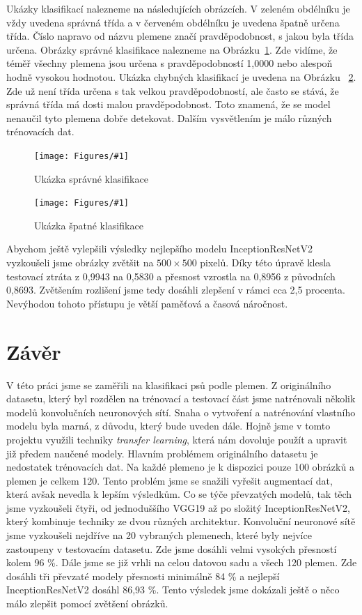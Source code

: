 \documentclass[a4paper,12pt]{article}
\newcommand{\image}[4]{\begin{figure}[ht!] \centering \texttt{[image: Figures/\#1]} \caption{#2} \label{#3} \end{figure}}
\begin{document}
Ukázky klasifikací nalezneme na následujících obrázcích. V zeleném obdélníku je vždy uvedena správná třída a v červeném obdélníku je uvedena špatně určena třída. Číslo napravo od názvu plemene značí pravděpodobnost, s jakou byla třída určena. Obrázky správné klasifikace nalezneme na Obrázku~\ref{fig:correct_class}. Zde vidíme, že téměř všechny plemena jsou určena s pravděpodobností 1,0000 nebo alespoň hodně vysokou hodnotou. Ukázka chybných klasifikací je uvedena na Obrázku ~\ref{fig:wrong_class}. Zde už není třída určena s tak velkou pravděpodobností, ale často se stává, že správná třída má dosti malou pravděpodobnost. Toto znamená, že se model nenaučil tyto plemena dobře detekovat. Dalším vysvětlením je málo různých trénovacích dat. 

\image{correct_predictions.pdf}{Ukázka správné klasifikace}{fig:correct_class}{0.8}
\image{wrong_predictions.pdf}{Ukázka špatné klasifikace}{fig:wrong_class}{0.8}

Abychom ještě vylepšili výsledky nejlepšího modelu InceptionResNetV2 vyzkoušeli jsme obrázky zvětšit na $500 \times 500$ pixelů. Díky této úpravě klesla testovací ztráta z 0,9943 na 0,5830 a přesnost vzrostla na 0,8956 z původních 0,8693. Zvětšením rozlišení jsme tedy dosáhli zlepšení v rámci cca 2,5 procenta. Nevýhodou tohoto přístupu je větší paměťová a časová náročnost.

\section{Závěr}
V této práci jsme se zaměřili na klasifikaci psů podle plemen. Z originálního datasetu, který byl rozdělen na trénovací a testovací část jsme natrénovali několik modelů konvolučních neuronových sítí. Snaha o vytvoření a natrénování vlastního modelu byla marná, z důvodu, který bude uveden dále. Hojně jsme v tomto projektu využili techniky \emph{transfer learning}, která nám dovoluje použít a upravit již předem naučené modely. Hlavním problémem originálního datasetu je nedostatek trénovacích dat. Na každé plemeno je k dispozici pouze 100 obrázků a plemen je celkem 120. Tento problém jsme se snažili vyřešit augmentací dat, která avšak nevedla k lepším výsledkům. Co se týče převzatých modelů, tak těch jsme vyzkoušeli čtyři, od jednoduššího VGG19 až po složitý InceptionResNetV2, který kombinuje techniky ze dvou různých architektur. Konvoluční neuronové sítě jsme vyzkoušeli nejdříve na 20 vybraných plemenech, které byly nejvíce zastoupeny v testovacím datasetu. Zde jsme dosáhli velmi vysokých přesností kolem 96 \%. Dále jsme se již vrhli na celou datovou sadu a všech 120 plemen. Zde dosáhli tři převzaté modely přesnosti minimálně 84 \% a nejlepší InceptionResNetV2 dosáhl 86,93 \%. Tento výsledek jsme dokázali ještě o něco málo zlepšit pomocí zvětšení obrázků.




\end{document}
